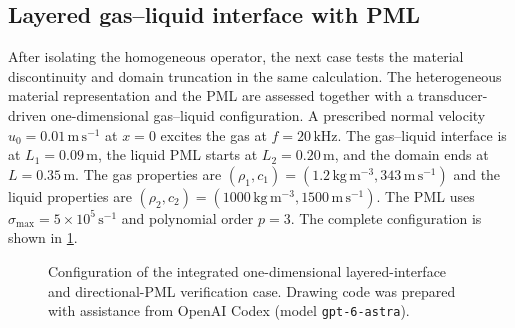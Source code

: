\documentclass[final,12pt,nopreprintline,longtitle]{elsarticle}
\newcommand{\x}{\mathbf{x}}
\newcommand{\h}{\boldsymbol{h}}
\newcommand{\schematicAidDisclosure}{Drawing code was prepared with assistance from
OpenAI Codex (model \texttt{gpt-6-astra}).}
\begin{document}
\subsection{Layered gas--liquid interface with PML}
\label{sec:layeredInterface}
\label{sec:combinedInterfacePML}

After isolating the homogeneous operator, the next case tests the material
discontinuity and domain truncation in the same calculation.  The
heterogeneous material representation and the PML are assessed together
with a transducer-driven one-dimensional gas--liquid configuration.  A
prescribed normal velocity
$u_0=0.01\,\mathrm{m\,s^{-1}}$ at $x=0$ excites the gas at
$f=20\,\mathrm{kHz}$.  The gas--liquid interface is at
$L_1=0.09\,\mathrm{m}$, the liquid PML starts at $L_2=0.20\,\mathrm{m}$, and
the domain ends at $L=0.35\,\mathrm{m}$.  The gas properties are
$(\rho_1,c_1)=(1.2\,\mathrm{kg\,m^{-3}},343\,\mathrm{m\,s^{-1}})$ and the
liquid properties are
$(\rho_2,c_2)=(1000\,\mathrm{kg\,m^{-3}},1500\,\mathrm{m\,s^{-1}})$.  The PML uses
$\sigma_{\max}=5\times10^5\,\mathrm{s^{-1}}$ and polynomial order $p=3$.
The complete configuration is shown in \cref{fig:combinedLayeredSchematic}.

\begin{figure}[htbp]
    \centering
    \caption{Configuration of the integrated one-dimensional layered-interface
    and directional-PML verification case.  \schematicAidDisclosure}
    \label{fig:combinedLayeredSchematic}
\end{figure}
\end{document}
